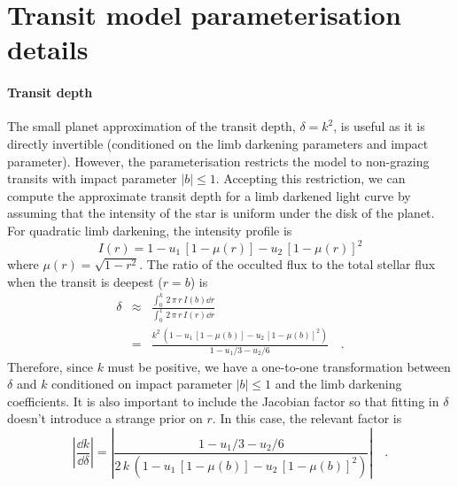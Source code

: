 \documentclass[floatfix,ApJL,twocolumn]{aastex631}
\begin{document}


{}


\appendix

\section{Transit model parameterisation details}\label{apdx:model_details}

\paragraph{Transit depth}
The small planet approximation of the transit depth, $\delta=k^2$, is useful as it is directly invertible (conditioned on the limb darkening parameters and impact parameter).
However, the parameterisation restricts the model to non-grazing transits with impact parameter $|b| \le 1$.
Accepting this restriction, we can compute the approximate transit depth for a limb darkened light curve by assuming that the intensity of the star is uniform under the disk of the planet.
For quadratic limb darkening, the intensity profile is
\begin{equation}
  I(r) = 1 - u_1\,[1 - \mu(r)] - u_2\,[1 - \mu(r)]^2
\end{equation}
where $\mu(r) = \sqrt{1 - r^2}$.
The ratio of the occulted flux to the total stellar flux when the transit is deepest ($r = b$) is \citep[the same results are discussed by][]{Mandel:2002,Csizmadia:2013, Agol:2020:AJ}
\begin{eqnarray}
  \delta &\approx& \frac{\int_0^k\,2\,\pi\,r\,I(b)\dd r}{\int_0^1\,2\,\pi\,r\,I(r)\dd r} \nonumber\\
  &=& \frac{k^2\,\left(1 - u_1\,[1 - \mu(b)] - u_2\,[1 - \mu(b)]^2\right)}{1 - u_1/3 - u_2/6}\quad.
\end{eqnarray}
Therefore, since $k$ must be positive, we have a one-to-one transformation between $\delta$ and $k$ conditioned on impact parameter $|b| \le 1$ and the limb darkening coefficients.
It is also important to include the Jacobian factor so that fitting in $\delta$ doesn't introduce a strange prior on $r$.
In this case, the relevant factor is
\begin{equation}
  \left|\frac{\dd k}{\dd \delta}\right| = \left|\frac{1 - u_1/3 - u_2/6}{2\,k\,\left(1 - u_1\,[1 - \mu(b)] - u_2\,[1 - \mu(b)]^2\right)}\right| \quad.
\end{equation}
\end{document}
